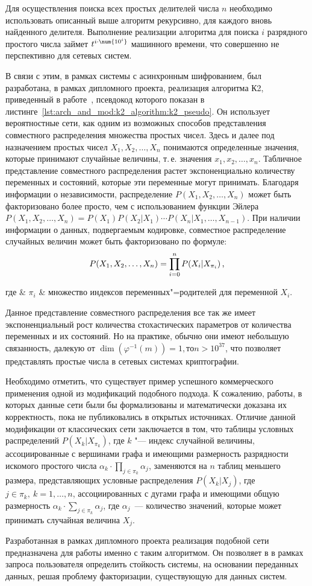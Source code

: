 Для осуществления поиска всех простых делителей числа $n$ необходимо использовать описанный выше алгоритм рекурсивно, для каждого вновь найденного делителя. Выполнение реализации алгоритма для поиска $i$ разрядного простого числа займет $t^{i\cdot \num{10^{i}}}$ машинного времени, что совершенно не перспективно для сетевых систем.

В связи с этим, в рамках системы с асинхронным шифрованием, был разработана, в рамках дипломного проекта, реализация алгоритма К2, приведенный в работе~\cite{Cooper1991}, псевдокод которого показан в листинге~\ref{lst:arch_and_mod:k2_algorithm:k2_pseudo}.
Он использует вероятностные сети, как одним из возможных способов представления совместного распределения множества простых чисел.
Здесь и далее под назначением простых чисел $ X_1, X_2, \dotsc, X_n $ понимаются определенные значения, которые принимают случайные величины, т.\,е. значения $ x_1, x_2, \dotsc, x_n $.
Табличное представление совместного распределения растет экспоненциально количеству переменных и состояний, которые эти переменные могут принимать.
Благодаря информации о независимости, распределение $ P(X_1, X_2,\dotsc, X_n) $ может быть факторизовано более просто, чем с использованием функции Эйлера $ P(X_1, X_2,\dotsc, X_n) = P(X_1) P(X_2|X_1) \dotsm P(X_n|X_1,\dotsc,X_{n-1}) $.
При наличии информации о данных, подвергаемым кодировке, совместное распределение случайных величин может быть факторизовано по формуле:
\begin{equation}
  \label{eq:domain:bayes_net:joint_disitr}
  P(X_1, X_2,\dotsc, X_n) = \prod_{i = 0}^{n}{P(X_i|X_{\pi_i})} \text{\,,}
\end{equation}
\begin{explanation}
где & $ \pi_i $ & множество индексов переменных"=родителей для переменной $X_i$.
\end{explanation}

Данное представление совместного распределения все так же имеет экспоненциальный рост количества стохастических параметров от количества переменных и их состояний.
Но на практике, обычно они имеют небольшую связанность, далекую от $ \dim(\varphi^{-1}(m)) = 1, то n > 10^{37} $, что позволяет представлять простые числа в сетевых системах криптографии.

Необходимо отметить, что существует пример успешного коммерческого применения одной из модификаций подобного подхода. К сожалению, работы, в которых данные сети были бы формализованы и математически доказана их корректность, пока не публиковались в открытых источниках.
Отличие данной модификации от классических сети заключается в том, что таблицы условных распределений $ P(X_k | X_{\pi_k}) $, где $k$ "--- индекс случайной величины, ассоциированные с вершинами графа и имеющими размерность разрядности искомого простого числа $ \alpha_k \cdot \prod_{j \in \pi_k}\alpha_j $, заменяются на $ n $ таблиц меньшего размера, представляющих условные распределения $ P(X_k | X_j) $, где $ j \in \pi_k,\ k = 1,\dotsc,n $, ассоциированных с дугами графа и имеющими общую размерность $ \alpha_k \cdot \sum_{j \in \pi_k}\alpha_j $, где $\alpha_j$~--- количество значений, которые может принимать случайная величина $X_j$.

Разработанная в рамках дипломного проекта реализация подобной сети предназначена для работы именно с таким алгоритмом. Он позволяет в в рамках запроса пользователя определить стойкость системы, на основании переданных данных, решая проблему факторизации, существующую для данных систем.


